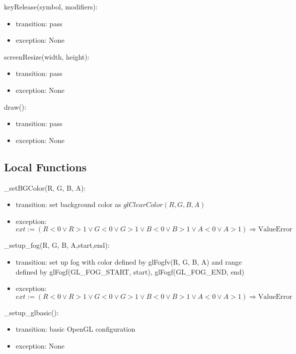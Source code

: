 \documentclass{article}
\begin{document}
\noindent keyRelease(symbol, modifiers):
\begin{itemize}
\item transition: pass
\item exception: None
\end{itemize}\vspace{6mm}

\noindent screenResize(width, height):
\begin{itemize}
\item transition: pass
\item exception: None
\end{itemize}\vspace{6mm}

\noindent draw():
\begin{itemize}
\item transition: pass
\item exception: None
\end{itemize}\vspace{6mm}

\subsection{Local Functions}


\noindent \_setBGColor(R, G, B, A):
\begin{itemize}
\item transition: set background color as $glClearColor(R, G, B, A)$
\item exception: $ext := (R<0 \lor R>1 \lor G<0 \lor G>1 \lor B<0 \lor B>1 \lor A<0 \lor A>1) \Rightarrow \text{ValueError}$
\end{itemize}\vspace{6mm}

\noindent \_setup\_fog(R, G, B, A,start,end):
\begin{itemize}
\item transition: set up fog with color defined by glFogfv(R, G, B, A) and range defined by glFogf(GL\_FOG\_START, start), glFogf(GL\_FOG\_END, end)
\item exception: $ext := (R<0 \lor R>1 \lor G<0 \lor G>1 \lor B<0 \lor B>1 \lor A<0 \lor A>1) \Rightarrow \text{ValueError}$
\end{itemize}\vspace{6mm}

\noindent \_setup\_glbasic():
\begin{itemize}
\item transition: basic OpenGL configuration
\item exception: None
\end{itemize}\vspace{6mm}
\end{document}
